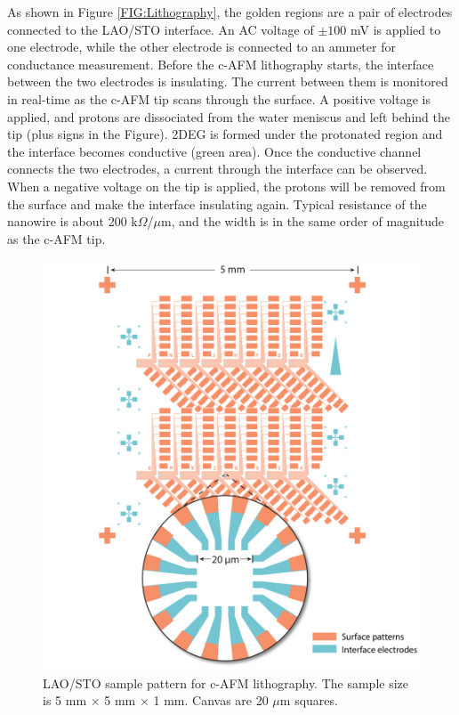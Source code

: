 \documentclass[pdflatex, sectionletters, 12pt]{pittetd}    %
\begin{document}
As shown in Figure \ref{FIG:Lithography}, the golden regions are a pair of electrodes connected to the LAO/STO interface. An AC voltage of $\pm100$ mV is applied to one electrode, while the other electrode is connected to an ammeter for conductance measurement. Before the c-AFM lithography starts, the interface between the two electrodes is insulating. The current between them is monitored in real-time as the c-AFM tip scans through the surface. A positive voltage is applied, and protons are dissociated from the water meniscus and left behind the tip (plus signs in the Figure). 2DEG is formed under the protonated region and the interface becomes conductive (green area). Once the conductive channel connects the two electrodes, a current through the interface can be observed. When a negative voltage on the tip is applied, the protons will be removed from the surface and make the interface insulating again. Typical resistance of the nanowire is about 200 k$\Omega$/$\mu$m, and the width is in the same order of magnitude as the c-AFM tip\cite{cen2008nanoscale}.

\begin{figure}[p]
	\centering
	\includegraphics[width=1\textwidth]{Drawing/Regular.pdf}
	\caption{LAO/STO sample pattern for c-AFM lithography. The sample size is 5 mm $\times$ 5 mm $\times$ 1 mm. Canvas are 20 $\mu$m squares.}
	\label{FIG:Regular}
\end{figure}
\end{document}
